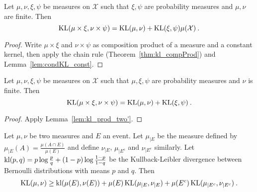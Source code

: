 \begin{lemma}
  \label{lem:kl_prod_two'}
  \leanok
  Let $\mu, \nu, \xi, \psi$ be measures on $\mathcal X$ such that $\xi, \psi$ are probability measures and $\mu, \nu$ are finite. Then
  $$\operatorname{KL}(\mu \times \xi, \nu \times \psi) = \operatorname{KL}(\mu, \nu) + \operatorname{KL}(\xi, \psi) \mu (\mathcal X) \: .$$
\end{lemma}

\begin{proof}
Write $\mu \times \xi$ and $\nu \times \psi$ as composition product of a measure and a constant kernel, then apply the chain rule (Theorem~\ref{thm:kl_compProd}) and Lemma~\ref{lem:condKL_const}.
\end{proof}

\begin{lemma}[Tensorization]
  \label{lem:kl_prod_two}
  \leanok
  Let $\mu, \nu, \xi, \psi$ be measures on $\mathcal X$ such that $\mu, \xi, \psi$ are probability measures and $\nu$ is finite. Then
  $$\operatorname{KL}(\mu \times \xi, \nu \times \psi) = \operatorname{KL}(\mu, \nu) + \operatorname{KL}(\xi, \psi) \: .$$
\end{lemma}

\begin{proof}
Apply Lemma~\ref{lem:kl_prod_two'}.
\end{proof}

\begin{lemma}
  \label{lem:kl_chain_rule_cond_event}
  Let $\mu, \nu$ be two measures and $E$ an event. Let $\mu_{|E}$ be the measure defined by $\mu_{|E}(A) = \frac{\mu(A \cap E)}{\mu(E)}$ and define $\nu_{|E}$, $\mu_{| E^c}$ and $\nu_{| E^c}$ similarly. Let $\operatorname{kl}(p,q) = p\log\frac{p}{q} + (1-p)\log\frac{1-p}{1-q}$ be the Kullback-Leibler divergence between Bernoulli distributions with means $p$ and $q$. Then
  \begin{align*}
  \operatorname{KL}(\mu, \nu) \ge \operatorname{kl}(\mu(E), \nu(E)) + \mu(E) \operatorname{KL}(\mu_{|E}, \nu_{|E}) + \mu(E^c) \operatorname{KL}(\mu_{|E^c}, \nu_{|E^c}) \: .
  \end{align*}
\end{lemma}

